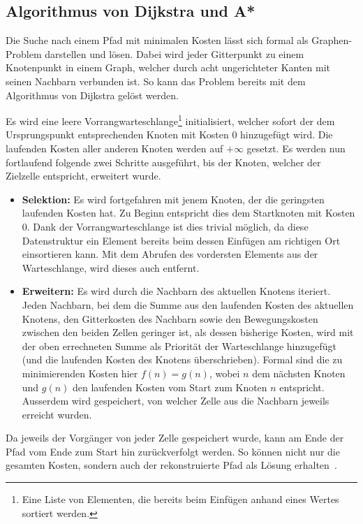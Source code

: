 \subsection{Algorithmus von Dijkstra und A*}

Die Suche nach einem Pfad mit minimalen Kosten lässt sich formal als Graphen-Problem darstellen und lösen. Dabei wird jeder Gitterpunkt zu einem Knotenpunkt in einem Graph, welcher durch acht ungerichteter Kanten mit seinen Nachbarn verbunden ist. So kann das Problem bereits mit dem Algorithmus von Dijkstra gelöst werden.~\cite{dijkstra1959note}

Es wird eine leere Vorrangwarteschlange\footnote{Eine Liste von Elementen, die bereits beim Einfügen anhand eines Wertes sortiert werden.} initialisiert, welcher sofort der dem Ursprungspunkt entsprechenden Knoten mit Kosten 0 hinzugefügt wird. Die laufenden Kosten aller anderen Knoten werden auf $+ \infty$ gesetzt. Es werden nun fortlaufend folgende zwei Schritte ausgeführt, bis der Knoten, welcher der Zielzelle entspricht, erweitert wurde.~\cite{dijkstra1959note}
\begin{itemize}
  \item \textbf{Selektion:} Es wird fortgefahren mit jenem Knoten, der die geringsten laufenden Kosten hat. Zu Beginn entspricht dies dem Startknoten mit Kosten 0. Dank der Vorrangwarteschlange ist dies trivial möglich, da diese Datenstruktur ein Element bereits beim dessen Einfügen am richtigen Ort einsortieren kann. Mit dem Abrufen des vordersten Elements aus der Warteschlange, wird dieses auch entfernt.~\cite{dijkstra1959note}
  \item \textbf{Erweitern:} Es wird durch die Nachbarn des aktuellen Knotens iteriert. Jeden Nachbarn, bei dem die Summe aus den laufenden Kosten des aktuellen Knotens, den Gitterkosten des Nachbarn sowie den Bewegungskosten zwischen den beiden Zellen geringer ist, als dessen bisherige Kosten, wird mit der oben errechneten Summe als Priorität der Warteschlange hinzugefügt (und die laufenden Kosten des Knotens überschrieben). Formal sind die zu minimierenden Kosten hier $f(n)=g(n)$, wobei $n$ dem nächsten Knoten und $g(n)$ den laufenden Kosten vom Start zum Knoten $n$ entspricht. Ausserdem wird gespeichert, von welcher Zelle aus die Nachbarn jeweils erreicht wurden.~\cite{dijkstra1959note}
\end{itemize}

Da jeweils der Vorgänger von jeder Zelle gespeichert wurde, kann am Ende der Pfad vom Ende zum Start hin zurückverfolgt werden. So können nicht nur die gesamten Kosten, sondern auch der rekonstruierte Pfad als Lösung erhalten~\cite{dijkstra1959note}.

